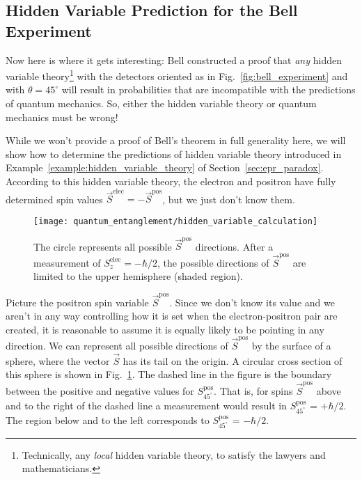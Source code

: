 \subsection{Hidden Variable Prediction for the Bell Experiment}

\label{subsec:hidden_variable_for_bell}

Now here is where it gets interesting: Bell constructed a proof that
\textit{any} hidden variable theory\footnote{Technically, any
\textit{local} hidden variable theory, to satisfy the lawyers and
mathematicians.} with the detectors oriented as in
Fig.~\ref{fig:bell_experiment} and with $\theta=45^\circ$ will result
in probabilities that are incompatible with the predictions of quantum
mechanics.  So, either the hidden variable theory or quantum mechanics
must be wrong!

While we won't provide a proof of Bell's theorem in full generality
here, we will show how to determine the predictions of
hidden variable theory introduced in
Example~\ref{example:hidden_variable_theory} of
Section~\ref{sec:epr_paradox}.  According to this hidden variable theory,
the electron and positron have fully determined spin values $\vec S^\text{elec}
 = -\vec S^\text{pos}$, but we just don't know them. 

\begin{figure}[h]
\begin{center}
\texttt{[image: quantum\_entanglement/hidden\_variable\_calculation]}
\caption{The circle represents all possible $\vec S^\text{pos}$
  directions.  After a measurement of $S_z^\text{elec}=-\hbar/2$, the
  possible directions of $\vec S^\text{pos}$ are limited to the upper
  hemisphere (shaded region).}
\label{fig:hidden_variable_calculation}
\end{center}
\end{figure}

Picture the positron spin variable $\vec S^\text{pos}$.  Since we
don't know its value and we aren't in any way controlling how it is
set when the electron-positron pair are created, it is reasonable to
assume it is equally likely to be pointing in any direction.  We can
represent all possible directions of $\vec S^\text{pos}$ by the
surface of a sphere, where the vector $\vec S$ has its tail on the
origin.  A circular cross section of this sphere is shown in
Fig.~\ref{fig:hidden_variable_calculation}.  The dashed line in the
figure is the boundary between the positive and negative values for
$S_{45^\circ}^\text{pos}$.  That is, for spins $\vec
S^\text{pos}$ above and to the right of the dashed line a measurement
would result in $S_{45^\circ}^\text{pos}$  = $+\hbar/2$.  The region below
and to the left corresponds to $S_{45^\circ}^\text{pos}$  = $-\hbar/2$.

